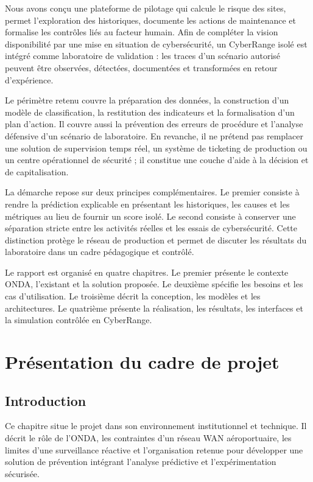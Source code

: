 \documentclass[12pt,a4paper,oneside]{report}
\begin{document}
Nous avons conçu une plateforme de pilotage qui calcule le risque des sites, permet l’exploration des historiques, documente les actions de maintenance et formalise les contrôles liés au facteur humain. Afin de compléter la vision disponibilité par une mise en situation de cybersécurité, un CyberRange isolé est intégré comme laboratoire de validation : les traces d’un scénario autorisé peuvent être observées, détectées, documentées et transformées en retour d’expérience.

Le périmètre retenu couvre la préparation des données, la construction d’un modèle de classification, la restitution des indicateurs et la formalisation d’un plan d’action. Il couvre aussi la prévention des erreurs de procédure et l’analyse défensive d’un scénario de laboratoire. En revanche, il ne prétend pas remplacer une solution de supervision temps réel, un système de ticketing de production ou un centre opérationnel de sécurité ; il constitue une couche d’aide à la décision et de capitalisation.

La démarche repose sur deux principes complémentaires. Le premier consiste à rendre la prédiction explicable en présentant les historiques, les causes et les métriques au lieu de fournir un score isolé. Le second consiste à conserver une séparation stricte entre les activités réelles et les essais de cybersécurité. Cette distinction protège le réseau de production et permet de discuter les résultats du laboratoire dans un cadre pédagogique et contrôlé.

Le rapport est organisé en quatre chapitres. Le premier présente le contexte ONDA, l’existant et la solution proposée. Le deuxième spécifie les besoins et les cas d’utilisation. Le troisième décrit la conception, les modèles et les architectures. Le quatrième présente la réalisation, les résultats, les interfaces et la simulation contrôlée en CyberRange.

\clearpage
\chapter{Présentation du cadre de projet}

\section{Introduction}

Ce chapitre situe le projet dans son environnement institutionnel et technique. Il décrit le rôle de l’ONDA, les contraintes d’un réseau WAN aéroportuaire, les limites d’une surveillance réactive et l’organisation retenue pour développer une solution de prévention intégrant l’analyse prédictive et l’expérimentation sécurisée.
\end{document}
